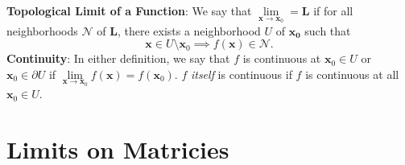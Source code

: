 \documentclass[11pt]{article}
\renewcommand{\vec}[1]{\mathbf{#1}}
\begin{document}
\textbf{Topological Limit of a Function}: We say that $\lim\limits_{\vec{x} \to \vec{x}_{0}} = \vec{L}$ if for all neighborhoods $\mathcal{N}$ of $\vec{L}$, there exists a neighborhood $U$ of $\vec{x_{0}}$ such that
\[
	\vec{x} \in U \setminus \vec{x}_{0} \implies f(\vec{x}) \in \mathcal{N}. 
\]
\textbf{Continuity}: In either definition, we say that $f$ is continuous at $\vec{x}_{0} \in U$ or $\vec{x}_{0} \in \partial U$ if $\lim\limits_{\vec{x} \to \vec{x}_{0}} f(\vec{x}) = f(\vec{x}_{0})$. $f$ \textit{itself} is continuous if $f$ is continuous at all $\vec{x}_{0} \in U$.


\section{Limits on Matricies}
\end{document}

